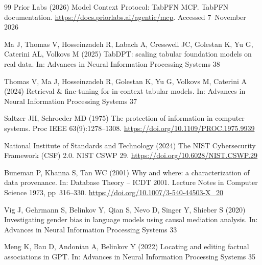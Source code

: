 \documentclass[pdflatex,sn-mathphys-num]{sn-jnl}
\begin{document}
\begin{thebibliography}{99}
Prior Labs (2026) Model Context Protocol: TabPFN MCP. TabPFN documentation.
\url{https://docs.priorlabs.ai/agentic/mcp}. Accessed 7~November 2026

Ma J, Thomas V, Hosseinzadeh R, Labach A, Cresswell JC, Golestan K, Yu G, Caterini AL, Volkovs M (2025) TabDPT: scaling tabular foundation models on real data. In: Advances in Neural Information Processing Systems 38

Thomas V, Ma J, Hosseinzadeh R, Golestan K, Yu G, Volkovs M, Caterini A (2024) Retrieval \&
fine-tuning for in-context tabular models. In: Advances in Neural Information Processing Systems 37

Saltzer JH, Schroeder MD (1975) The protection of information in computer systems. Proc IEEE
63(9):1278--1308. \url{https://doi.org/10.1109/PROC.1975.9939}

National Institute of Standards and Technology (2024) The NIST Cybersecurity Framework (CSF) 2.0.
NIST CSWP 29. \url{https://doi.org/10.6028/NIST.CSWP.29}

Buneman P, Khanna S, Tan WC (2001) Why and where: a characterization of data provenance. In:
Database Theory -- ICDT 2001. Lecture Notes in Computer Science 1973, pp~316--330. \url{https://doi.org/10.1007/3-540-44503-X_20}

Vig J, Gehrmann S, Belinkov Y, Qian S, Nevo D, Singer Y, Shieber S (2020) Investigating gender bias
in language models using causal mediation analysis. In: Advances in Neural Information Processing
Systems 33

Meng K, Bau D, Andonian A, Belinkov Y (2022) Locating and editing factual associations in GPT. In:
Advances in Neural Information Processing Systems 35

\end{thebibliography}
\end{document}
